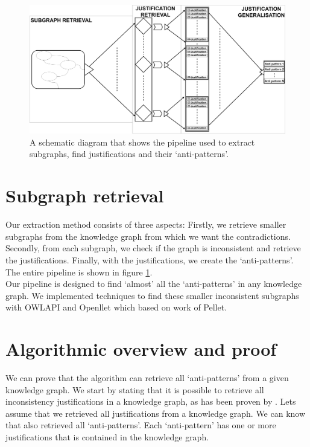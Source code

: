 \documentclass[11pt,letterpaper ,oneside ]{book}
\begin{document}
\begin{figure}
	\includegraphics[width=\linewidth]{images/SimplifiedPipelineMissingPart.png}
	\caption{A schematic diagram that shows the pipeline used to extract subgraphs, find justifications and their `anti-patterns'.}
	\label{fig:simplePipeline}
\end{figure}
\section{Subgraph retrieval}

Our extraction method consists of three aspects: Firstly, we retrieve smaller subgraphs from the knowledge graph from which we want the contradictions. Secondly, from each subgraph, we check if the graph is inconsistent and retrieve the justifications. Finally, with the justifications, we create the `anti-patterns'. The entire pipeline is shown in figure \ref{fig:simplePipeline}.\\
Our pipeline is designed to find `almost' all the `anti-patterns' in any knowledge graph. We implemented techniques to find these smaller inconsistent subgraphs with OWLAPI\cite{Horridge:2011} and Openllet\cite{Openllet:2019} which based on work of Pellet\cite{Pellet:2007}.\\

\section{Algorithmic overview and proof}
We can prove that the algorithm can retrieve all `anti-patterns' from a given knowledge graph. We start by stating that it is possible to retrieve all inconsistency justifications in a knowledge graph, as has been proven by \cite{Horridge:2009}. Lets assume that we retrieved all justifications from a knowledge graph. We can know that also retrieved all `anti-patterns'. Each `anti-pattern' has one or more justifications that is contained in the knowledge graph. \\
\end{document}

